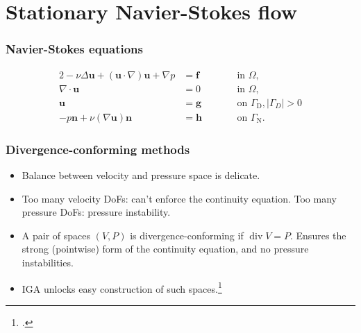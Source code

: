 \documentclass{beamer}
\begin{document}
\section{Stationary Navier-Stokes flow}

\begin{frame}
  \frametitle{Navier-Stokes equations}

  \begin{alignat*}{2}
    -\nu \Delta \bm u + (\bm u \cdot \nabla) \bm u + \nabla p &= \bm f && \qquad \text{in } \Omega, \\
    \nabla \cdot \bm u &= 0 && \qquad \text{in } \Omega, \\
    \bm u &= \bm g && \qquad \text{on } \Gamma_\text{D}, |\Gamma_D| > 0 \\
    -p \bm n + \nu (\nabla \bm u) \bm n &= \bm h && \qquad \text{on } \Gamma_\text{N}.
  \end{alignat*}
\end{frame}

\begin{frame}
  \frametitle{Divergence-conforming methods}

  \begin{itemize}
  \item Balance between velocity and pressure space is delicate.
  \item Too many velocity DoFs: can't enforce the continuity equation. Too many pressure DoFs:
    pressure instability.
  \item A pair of spaces $(V,P)$ is divergence-conforming if $\operatorname{div} V = P$. Ensures the strong
    (pointwise) form of the continuity equation, and no pressure instabilities.
  \item IGA unlocks easy construction of such spaces.\footcite{Buffa2010iae,Evans2013idc1}
  \end{itemize}
\end{frame}
\end{document}
